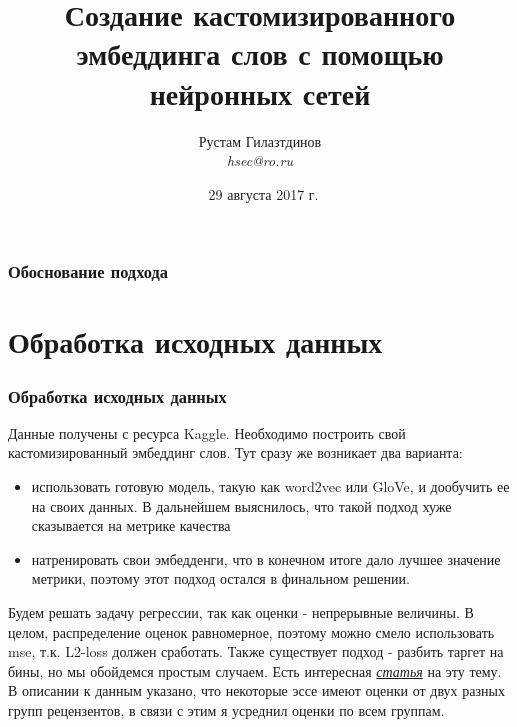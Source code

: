 \documentclass{beamer}
\title{Создание кастомизированного эмбеддинга слов с помощью
  нейронных сетей} %
\author{Рустам Гилазтдинов\\
\textit{hsec@ro.ru}} %
\date{\ 29 августа 2017 г. } %
\begin{document}
\begin{frame}
\titlepage %
\end{frame}

\begin{frame}
\frametitle{Обоснование подхода} %
\tableofcontents %
\end{frame}


\section{Обработка исходных данных} 

\begin{frame}
\frametitle{Обработка исходных данных}
Данные получены с ресурса Kaggle.
Необходимо построить свой кастомизированный эмбеддинг слов. Тут
сразу же возникает два варианта:
\begin{itemize}
\item {использовать готовую модель, такую как word2vec или GloVe, и дообучить ее
  на своих данных. В дальнейшем выяснилось, что такой подход хуже
  сказывается на метрике качества}
\item {натренировать свои эмбедденги, что в конечном итоге дало лучшее значение
    метрики, поэтому этот подход остался в финальном решении.}
\end{itemize}
  Будем решать задачу регрессии, так как оценки
- непрерывные величины. В целом, распределение оценок равномерное, поэтому можно
смело использовать mse, т.к. L2-loss должен сработать. Также существует подход
- разбить таргет на бины, но мы обойдемся простым случаем. Есть интересная
\href{https://arxiv.org/abs/1612.00775} {\textit {\color{red} статья}} на эту тему.
В описании к данным указано, что некоторые эссе имеют оценки от двух разных
групп рецензентов, в связи с этим я усреднил оценки по всем группам.
\end{frame}
\end{document}
